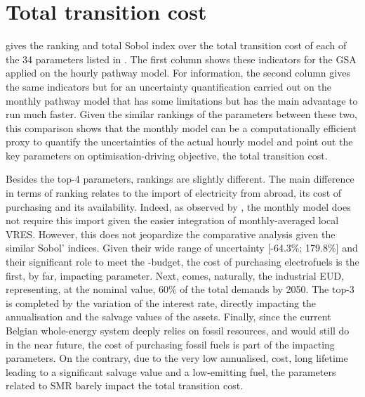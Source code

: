 \section{Total transition cost}
\label{app:UQ_transition_cost}

 gives the ranking and total Sobol index over the total transition cost of each of the 34 parameters listed in . The first column shows these indicators for the \gls{GSA} applied on the hourly pathway model. For information, the second column gives the same indicators but for an uncertainty quantification carried out on the monthly pathway model that has some limitations \cite{limpens2024pathway} but has the main advantage to run much faster. Given the similar rankings of the parameters between these two, this comparison shows that the monthly model can be a computationally efficient proxy to quantify the uncertainties of the actual hourly model and point out the key parameters on optimisation-driving objective, the total transition cost. 

Besides the top-4 parameters, rankings are slightly different. The main difference in terms of ranking relates to the import of electricity from abroad, \ie its cost of purchasing and its availability. Indeed, as observed by \citet{limpens2024pathway}, the monthly model does not require this import given the easier integration of monthly-averaged local \gls{VRES}. However, this does not jeopardize the comparative analysis given the similar Sobol' indices. Given their wide range of uncertainty [-64.3\%; 179.8\%] and their significant role to meet the -budget, the cost of purchasing electrofuels is the first, by far, impacting parameter. Next, comes, naturally, the industrial \gls{EUD}, representing, at the nominal value, 60\% of the total demands by 2050. The top-3 is completed by the variation of the interest rate, directly impacting the annualisation and the salvage values of the assets. Finally, since the current Belgian whole-energy system deeply relies on fossil resources, and would still do in the near future, the cost of purchasing fossil fuels is part of the impacting parameters. On the contrary, due to the very low annualised, cost, long lifetime leading to a significant salvage value and a low-emitting fuel, the parameters related to \gls{SMR} barely impact the total transition cost.


